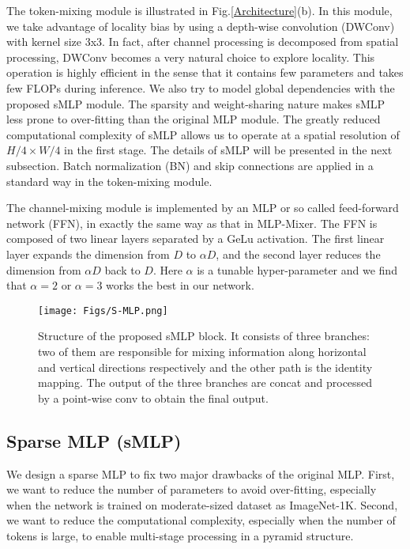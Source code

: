 \documentclass[letterpaper]{article} \usepackage{aaai22}  \usepackage{times}  \usepackage{helvet}  \usepackage{courier}  \usepackage[hyphens]{url}  \usepackage{graphicx} \usepackage{color}
\begin{document}
The token-mixing module is illustrated in Fig.\ref{Architecture}(b). In this module, we take advantage of locality bias by using a depth-wise convolution (DWConv) with kernel size 3x3. In fact, after channel processing is decomposed from spatial processing, DWConv becomes a very natural choice to explore locality. This operation is highly efficient in the sense that it contains few parameters and takes few FLOPs during inference. We also try to model global dependencies with the proposed sMLP module. The sparsity and weight-sharing nature makes sMLP less prone to over-fitting than the original MLP module. The greatly reduced computational complexity of sMLP allows us to operate at a spatial resolution of $H/4 \times W/4$ in the first stage. The details of sMLP will be presented in the next subsection. Batch normalization (BN) and skip connections are applied in a standard way in the token-mixing module. 

The channel-mixing module is implemented by an MLP or so called feed-forward network (FFN), in exactly the same way as that in MLP-Mixer. The FFN is composed of two linear layers separated by a GeLu activation. The first linear layer expands the dimension from $D$ to $\alpha D$, and the second layer reduces
the dimension from $\alpha D$ back to $D$. Here $\alpha$ is a tunable hyper-parameter and we find that $\alpha=2$ or $\alpha=3$ works the best in our network. 

\begin{figure}[t]
\centering
\texttt{[image: Figs/S-MLP.png]} \caption{Structure of the proposed sMLP block. It consists of three branches: two of them are responsible for mixing information along horizontal and vertical directions respectively and the other path is the identity mapping. The output of the three branches are concat and processed by a point-wise conv to obtain the final output.}
\label{fig:sMLP}
\end{figure}


\subsection{Sparse MLP (sMLP)}
We design a sparse MLP to fix two major drawbacks of the original MLP. First, we want to reduce the number of parameters to avoid over-fitting, especially when the network is trained on moderate-sized dataset as ImageNet-1K. Second, we want to reduce the computational complexity, especially when the number of tokens is large, to enable multi-stage processing in a pyramid structure. 
\end{document}
